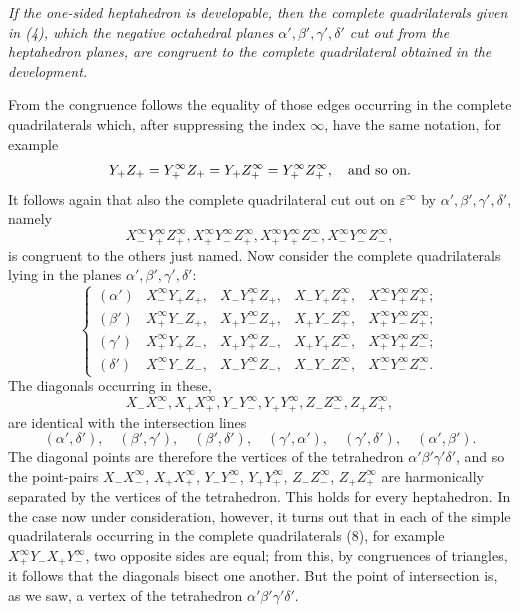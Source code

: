 \documentclass[11pt,a4paper]{article}
\begin{document}
\emph{If the one-sided heptahedron is developable, then the complete quadrilaterals given in (4), which the negative octahedral planes $\alpha',\beta',\gamma',\delta'$ cut out from the heptahedron planes, are congruent to the complete quadrilateral obtained in the development.}

From the congruence follows the equality of those edges occurring in the complete quadrilaterals which, after suppressing the index $\infty$, have the same notation, for example
\[
Y_+Z_+=Y_+^\infty Z_+=Y_+Z_+^\infty=Y_+^\infty Z_+^\infty,\quad\hbox{and so on.}
\]
It follows again that also the complete quadrilateral cut out on $\varepsilon^\infty$ by $\alpha',\beta',\gamma',\delta'$, namely
\[
X_-^\infty Y_+^\infty Z_+^\infty,
X_+^\infty Y_-^\infty Z_+^\infty,
X_+^\infty Y_+^\infty Z_-^\infty,
X_-^\infty Y_-^\infty Z_-^\infty,
\]
is congruent to the others just named. Now consider the complete quadrilaterals lying in the planes $\alpha',\beta',\gamma',\delta'$:
\[
\renewcommand{\arraystretch}{1.2}
\left\{
\begin{array}{lllll}
(\alpha')&X_-^\infty Y_+Z_+,&X_-Y_+^\infty Z_+,&X_-Y_+Z_+^\infty,&X_-^\infty Y_+^\infty Z_+^\infty;\\
(\beta')&X_+^\infty Y_-Z_+,&X_+Y_-^\infty Z_+,&X_+Y_-Z_+^\infty,&X_+^\infty Y_-^\infty Z_+^\infty;\\
(\gamma')&X_+^\infty Y_+Z_-,&X_+Y_+^\infty Z_-,&X_+Y_+Z_-^\infty,&X_+^\infty Y_+^\infty Z_-^\infty;\\
(\delta')&X_-^\infty Y_-Z_-,&X_-Y_-^\infty Z_-,&X_-Y_-Z_-^\infty,&X_-^\infty Y_-^\infty Z_-^\infty.
\end{array}\right.\tag{8}
\]
The diagonals occurring in these,
\[
 X_-X_-^\infty,
 X_+X_+^\infty,
 Y_-Y_-^\infty,
 Y_+Y_+^\infty,
 Z_-Z_-^\infty,
 Z_+Z_+^\infty,
\]
are identical with the intersection lines
\[
(\alpha',\delta'),\quad(\beta',\gamma'),\quad(\beta',\delta'),\quad(\gamma',\alpha'),\quad(\gamma',\delta'),\quad(\alpha',\beta').
\]
The diagonal points are therefore the vertices of the tetrahedron $\alpha'\beta'\gamma'\delta'$, and so the point-pairs $X_-X_-^\infty$, $X_+X_+^\infty$, $Y_-Y_-^\infty$, $Y_+Y_+^\infty$, $Z_-Z_-^\infty$, $Z_+Z_+^\infty$ are harmonically separated by the vertices of the tetrahedron. This holds for every heptahedron. In the case now under consideration, however, it turns out that in each of the simple quadrilaterals occurring in the complete quadrilaterals (8), for example $X_+^\infty Y_-X_+Y_-^\infty$, two opposite sides are equal; from this, by congruences of triangles, it follows that the diagonals bisect one another. But the point of intersection is, as we saw, a vertex of the tetrahedron $\alpha'\beta'\gamma'\delta'$.
\end{document}
